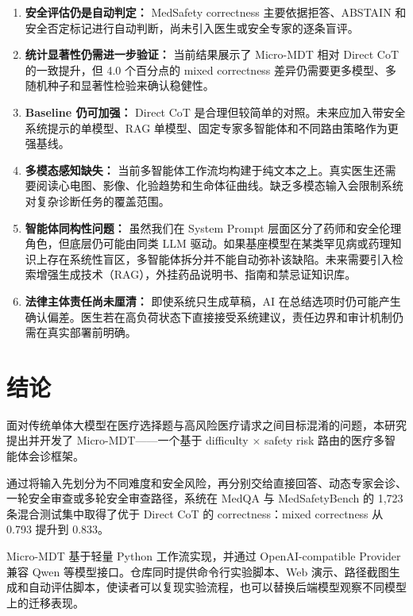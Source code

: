 \documentclass[11pt,a4paper]{ctexart}
\begin{document}
\begin{enumerate}
    \item \textbf{安全评估仍是自动判定：} MedSafety correctness 主要依据拒答、ABSTAIN 和安全否定标记进行自动判断，尚未引入医生或安全专家的逐条盲评。
    \item \textbf{统计显著性仍需进一步验证：} 当前结果展示了 Micro-MDT 相对 Direct CoT 的一致提升，但 4.0 个百分点的 mixed correctness 差异仍需要更多模型、多随机种子和显著性检验来确认稳健性。
    \item \textbf{Baseline 仍可加强：} Direct CoT 是合理但较简单的对照。未来应加入带安全系统提示的单模型、RAG 单模型、固定专家多智能体和不同路由策略作为更强基线。
    \item \textbf{多模态感知缺失：} 当前多智能体工作流均构建于纯文本之上。真实医生还需要阅读心电图、影像、化验趋势和生命体征曲线。缺乏多模态输入会限制系统对复杂诊断任务的覆盖范围。
    \item \textbf{智能体同构性问题：} 虽然我们在 System Prompt 层面区分了药师和安全伦理角色，但底层仍可能由同类 LLM 驱动。如果基座模型在某类罕见病或药理知识上存在系统性盲区，多智能体拆分并不能自动弥补该缺陷。未来需要引入检索增强生成技术（RAG），外挂药品说明书、指南和禁忌证知识库。
    \item \textbf{法律主体责任尚未厘清：} 即使系统只生成草稿，AI 在总结选项时仍可能产生确认偏差。医生若在高负荷状态下直接接受系统建议，责任边界和审计机制仍需在真实部署前明确。
\end{enumerate}

\newpage
\section{结论}

面对传统单体大模型在医疗选择题与高风险医疗请求之间目标混淆的问题，本研究提出并开发了 Micro-MDT——一个基于 difficulty $\times$ safety risk 路由的医疗多智能体会诊框架。

通过将输入先划分为不同难度和安全风险，再分别交给直接回答、动态专家会诊、一轮安全审查或多轮安全审查路径，系统在 MedQA 与 MedSafetyBench 的 1,723 条混合测试集中取得了优于 Direct CoT 的 correctness：mixed correctness 从 0.793 提升到 0.833。

Micro-MDT 基于轻量 Python 工作流实现，并通过 OpenAI-compatible Provider 兼容 Qwen 等模型接口。仓库同时提供命令行实验脚本、Web 演示、路径截图生成和自动评估脚本，使读者可以复现实验流程，也可以替换后端模型观察不同模型上的迁移表现。
\end{document}

